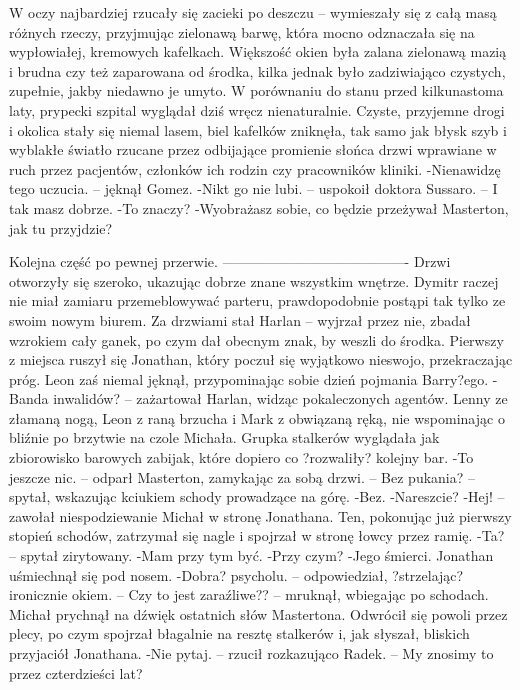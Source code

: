 \documentclass[../MAIN.tex]{subfiles}
\begin{document}
W oczy najbardziej rzucały się zacieki po deszczu -- wymieszały się z całą masą różnych rzeczy, przyjmując zielonawą barwę, która mocno odznaczała się na wypłowiałej, kremowych kafelkach.
Większość okien była zalana zielonawą mazią i brudna czy też zaparowana od środka, kilka jednak było zadziwiająco czystych, zupełnie, jakby niedawno je umyto.
W porównaniu do stanu przed kilkunastoma laty, prypecki szpital wyglądał dziś wręcz nienaturalnie.
Czyste, przyjemne drogi i okolica stały się niemal lasem, biel kafelków zniknęła, tak samo jak błysk szyb i wyblakłe światło rzucane przez odbijające promienie słońca drzwi wprawiane w ruch przez pacjentów, członków ich rodzin czy pracowników kliniki.
-Nienawidzę tego uczucia. -- jęknął Gomez.
-Nikt go nie lubi. -- uspokoił doktora Sussaro. -- I tak masz dobrze.
-To znaczy?
-Wyobrażasz sobie, co będzie przeżywał Masterton, jak tu przyjdzie?

Kolejna część po pewnej przerwie.
----------------------------------------
Drzwi otworzyły się szeroko, ukazując dobrze znane wszystkim wnętrze. Dymitr raczej nie miał zamiaru przemeblowywać parteru, prawdopodobnie postąpi tak tylko ze swoim nowym biurem.
Za drzwiami stał Harlan -- wyjrzał przez nie, zbadał wzrokiem cały ganek, po czym dał obecnym znak, by weszli do środka. Pierwszy z miejsca ruszył się Jonathan, który poczuł się wyjątkowo nieswojo, przekraczając próg. Leon zaś niemal jęknął, przypominając sobie dzień pojmania Barry?ego.
-Banda inwalidów? -- zażartował Harlan, widząc pokaleczonych agentów. Lenny ze złamaną nogą, Leon z raną brzucha i Mark z obwiązaną ręką, nie wspominając o bliźnie po brzytwie na czole Michała. Grupka stalkerów wyglądała jak zbiorowisko barowych zabijak, które dopiero co ?rozwaliły? kolejny bar.
-To jeszcze nic. -- odparł Masterton, zamykając za sobą drzwi. -- Bez pukania? -- spytał, wskazując kciukiem schody prowadzące na górę.
-Bez.
-Nareszcie?
-Hej! -- zawołał niespodziewanie Michał w stronę Jonathana. Ten, pokonując już pierwszy stopień schodów, zatrzymał się nagle i spojrzał w stronę łowcy przez ramię.
-Ta? -- spytał zirytowany.
-Mam przy tym być.
-Przy czym?
-Jego śmierci.
Jonathan uśmiechnął się pod nosem.
-Dobra? psycholu. -- odpowiedział, ?strzelając? ironicznie okiem. -- Czy to jest zaraźliwe?? -- mruknął, wbiegając po schodach.
Michał prychnął na dźwięk ostatnich słów Mastertona. Odwrócił się powoli przez plecy, po czym spojrzał błagalnie na resztę stalkerów i, jak słyszał, bliskich przyjaciół Jonathana.
-Nie pytaj. -- rzucił rozkazująco Radek. -- My znosimy to przez czterdzieści lat?
\end{document}
